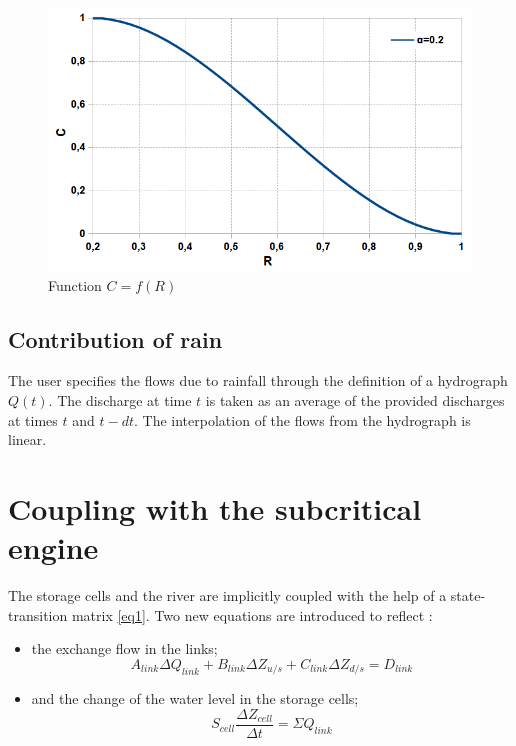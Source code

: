 \begin{figure}[H]
  \begin{center}
    \includegraphics[width=\textwidth]{Figures/CR.png}
    \caption{Function $C=f(R)$}
  \end{center}
\end{figure}

\subsection{Contribution of rain}

The user specifies the flows due to rainfall through the definition of a hydrograph $Q(t)$. The discharge at time $t$ is taken as an average of the provided discharges at times $t$ and $t - dt$. The interpolation of the flows from the hydrograph is linear.

\section{Coupling with the subcritical engine}
\label{CplNyFlv}

The storage cells and the river are implicitly coupled with the help of a state-transition matrix \ref{eq1}. Two new equations are introduced to reflect :

\begin{itemize}
 \item the exchange flow in the links;
   \begin{equation}
     A_{link}\Delta Q_{link}+B_{link}\Delta Z_{u/s} + C_{link}\Delta Z_{d/s} = D_{link}
   \end{equation}
 \item and the change of the water level in the storage cells;
    \begin{equation}
     S_{cell}\frac{\Delta Z_{cell}}{\Delta t} = \Sigma Q_{link}
   \end{equation}
\end{itemize}

